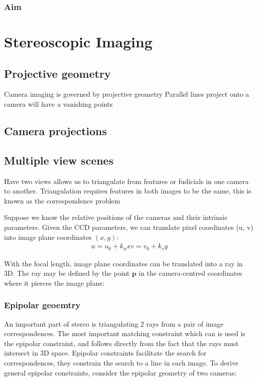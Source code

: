 \subsubsection{Aim}


\section{Stereoscopic Imaging}

\subsection{Projective geometry}

Camera imaging is governed by projective geometry
Parallel lines project onto a camera will have a vanishing points

\subsection{Camera projections}

\subsection{Multiple view scenes}
Have two views allows us to triangulate from features or fudicials in one camera to another.
Triangulation requires features in both images to be the same, this is known as the correspondence problem

Suppose we know the relative positions of the cameras and their intrinsic parameters.
Given the CCD parameters, we can translate pixel coordinates (u, v) into image plane coordinates $(x, y)$:
\begin{align}
    u = u_0 + k_u x
    v = v_0 + k_v y
\end{align}

With the focal length, image plane coordinates can be translated into a ray in 3D.
The ray may be defined by the point $\textbf{p}$ in the camera-centred coordinates where it pierces the image plane:

\subsubsection{Epipolar geoemtry}
An important part of stereo is triangulating 2 rays from a pair of image correspondences.
The most important matching constraint which can is used is the epipolar constraint, and follows directly from the fact that the rays must intersect in 3D space.
Epipolar constraints facilitate the search for correspondences, they constrain the search to a line in each image.
To derive general epipolar constraints, consider the epipolar geometry of two cameras:

